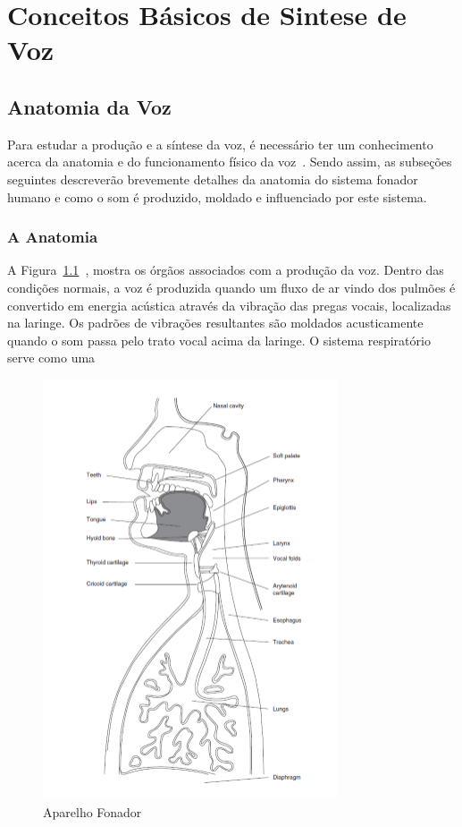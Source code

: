 
\chapter{Conceitos Básicos de Sintese de Voz}
\section{Anatomia da Voz}
	Para estudar a produção e a síntese da voz, é necessário ter um conhecimento acerca da anatomia e do funcionamento físico da voz~\cite{Foundation1}. Sendo assim, as subseções seguintes descreverão brevemente detalhes da anatomia do sistema fonador humano e como o som é produzido, moldado e inﬂuenciado por este sistema.
	\subsection{A Anatomia}
	A Figura~\ref{fig:aparelhoFonador}~\cite{Foundation1}, mostra os órgãos associados com a produção da voz. Dentro das condições normais, a voz é produzida quando um ﬂuxo de ar vindo dos pulmões é convertido em energia acústica através da vibração das pregas vocais, localizadas na laringe. Os padrões de vibrações resultantes são moldados acusticamente quando o som passa pelo trato vocal acima da laringe. O sistema respiratório serve como uma
	
	\begin{figure}
		\centering
		\includegraphics[scale=0.5]{aparelhoFonador}
		\caption{Aparelho Fonador}
		\label{fig:aparelhoFonador}
	\end{figure}
	
